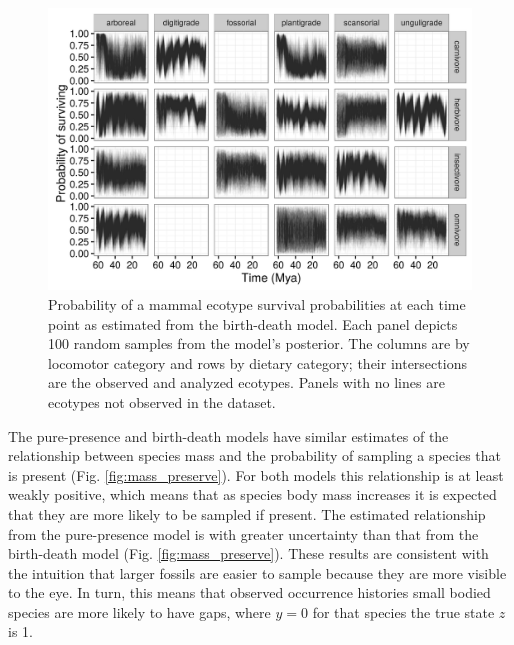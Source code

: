 \begin{figure}[ht]
  \centering
  \includegraphics[width=\textwidth,height=0.4\textheight,keepaspectratio=true]{chapter_coping/figure/ecotype_survival_bd}
  \caption[Ecotype survival probability estimated from the birth-death model]{Probability of a mammal ecotype survival probabilities at each time point as estimated from the birth-death model. Each panel depicts 100 random samples from the model's posterior. The columns are by locomotor category and rows by dietary category; their intersections are the observed and analyzed ecotypes. Panels with no lines are ecotypes not observed in the dataset.}
  \label{fig:eco_survival}
\end{figure}


The pure-presence and birth-death models have similar estimates of the relationship between species mass and the probability of sampling a species that is present (Fig. \ref{fig:mass_preserve}). For both models this relationship is at least weakly positive, which means that as species body mass increases it is expected that they are more likely to be sampled if present. The estimated relationship from the pure-presence model is with greater uncertainty than that from the birth-death model (Fig. \ref{fig:mass_preserve}). These results are consistent with the intuition that larger fossils are easier to sample because they are more visible to the eye. In turn, this means that observed occurrence histories small bodied species are more likely to have gaps, where \(y = 0\) for that species the true state \(z\) is 1. 

